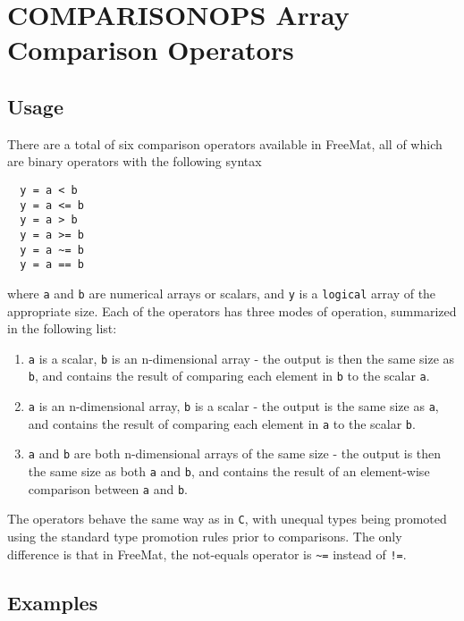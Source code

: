 \section{COMPARISONOPS Array Comparison Operators}

\subsection{Usage}

There are a total of six comparison operators available in FreeMat, all of which are binary operators with the following syntax
\begin{verbatim}
  y = a < b
  y = a <= b
  y = a > b
  y = a >= b
  y = a ~= b
  y = a == b
\end{verbatim}
where \verb|a| and \verb|b| are numerical arrays or scalars, and \verb|y| is a \verb|logical| array of the appropriate size.  Each of the operators has three modes of operation, summarized in the following list:
\begin{enumerate}
\item  \verb|a| is a scalar, \verb|b| is an n-dimensional array - the output is then the same size as \verb|b|, and contains the result of comparing each element in \verb|b| to the scalar \verb|a|.

\item  \verb|a| is an n-dimensional array, \verb|b| is a scalar - the output is the same size as \verb|a|, and contains the result of comparing each element in \verb|a| to the scalar \verb|b|.

\item  \verb|a| and \verb|b| are both n-dimensional arrays of the same size - the output is then the same size as both \verb|a| and \verb|b|, and contains the result of an element-wise comparison between \verb|a| and \verb|b|.

\end{enumerate}
The operators behave the same way as in \verb|C|, with unequal types being promoted using the standard type promotion rules prior to comparisons.  The only difference is that in FreeMat, the not-equals operator is \verb|~=| instead of \verb|!=|.
\subsection{Examples}

